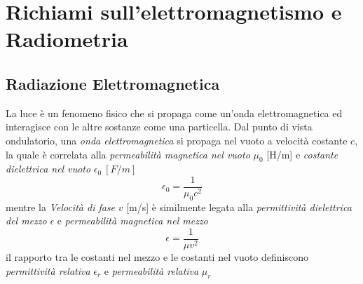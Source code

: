 \label{chapter1}
\chapter{Richiami sull'elettromagnetismo e Radiometria}
\section{Radiazione Elettromagnetica}
La luce \`e un fenomeno fisico che si propaga come un'onda elettromagnetica ed interagisce con le altre sostanze come una particella. Dal punto di 
vista ondulatorio, una \textit{onda elettromagnetica} si propaga nel vuoto a velocit\`a costante $c$, la quale \`e correlata alla
\textit{permeabilit\`a magnetica nel vuoto} $\mu_0$ [\si{H/m}] e \textit{costante dielettrica nel vuoto} $\epsilon_0\ [\si{F/m}]$
\[ \epsilon_0 = \frac{1}{\mu_0 c^2} \]
mentre la \textit{Velocit\`a di fase} $v$ [\si{m/s}] \`e similmente legata alla \textit{permittivit\`a dielettrica del mezzo} $\epsilon$ e 
\textit{permeabilit\`a magnetica nel mezzo}
\[ \epsilon = \frac{1}{\mu v^2} \]
il rapporto tra le costanti nel mezzo e le costanti nel vuoto definiscono \textit{permittivit\`a relativa} $\epsilon_r$ e 
\textit{permeabilit\`a relativa} $\mu_r$\par
%
